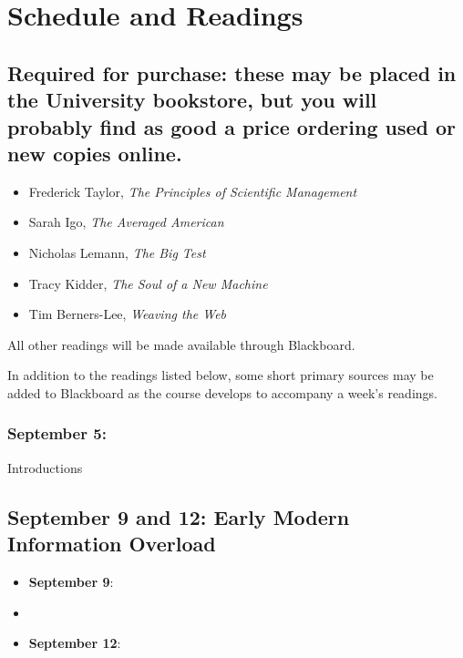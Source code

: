 \section{Schedule and Readings}\label{schedule-and-readings}

\subsection{Required for purchase: these may be placed in the University
bookstore, but you will probably find as good a price ordering used or
new copies
online.}\label{required-for-purchase-these-may-be-placed-in-the-university-bookstore-but-you-will-probably-find-as-good-a-price-ordering-used-or-new-copies-online.}

\begin{itemize}
\itemsep1pt\parskip0pt
\item
  Frederick Taylor, \emph{The Principles of Scientific Management}
\item
  Sarah Igo, \emph{The Averaged American}
\item
  Nicholas Lemann, \emph{The Big Test}
\item
  Tracy Kidder, \emph{The Soul of a New Machine}
\item
  Tim Berners-Lee, \emph{Weaving the Web}
\end{itemize}

All other readings will be made available through Blackboard.

In addition to the readings listed below, some short primary sources may
be added to Blackboard as the course develops to accompany a week's
readings.

\subsubsection{September 5:}\label{september-5}

Introductions

\subsection{September 9 and 12: Early Modern Information
Overload}\label{september-9-and-12-early-modern-information-overload}

\begin{itemize}
\item
  \textbf{September 9}: \cite{blair_reading_2003}
\item
  \cite{plato}
\item
  \textbf{September 12}: \cite{muller-wille_natural_2012}
\end{itemize}

